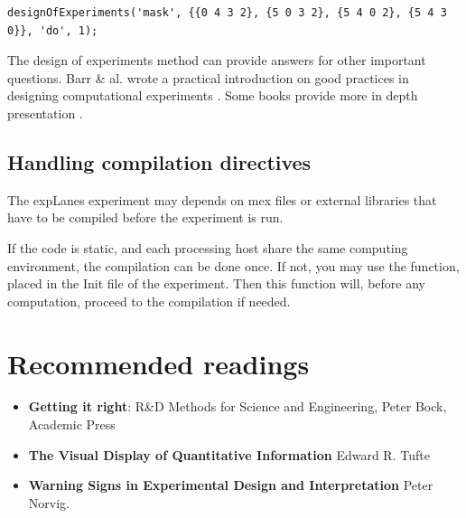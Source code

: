 \documentclass[a4paper,fleqn]{tufte-handout}
\newcommand{\explanes}{\textsf{expLanes} }
\begin{document}
\begin{lstlisting}
designOfExperiments('mask', {{0 4 3 2}, {5 0 3 2}, {5 4 0 2}, {5 4 3 0}}, 'do', 1);
\end{lstlisting}

The design of experiments method can provide answers for other important questions. Barr \& al.  wrote a practical introduction on good practices in designing computational experiments \cite{design}. Some books provide more in depth presentation \cite{de,se}.




\subsection{Handling compilation directives}

The \explanes experiment may depends on mex files or external libraries that have to be compiled before the experiment is run.

If the code is static, and each processing host share the same computing environment, the compilation can be done once. If not, you may use the  function, placed in the Init file of the experiment. Then this function will, before any computation, proceed to the compilation if needed.

%
%
%
%
%
%
%
%
%
%
%
%
%

\section{Recommended readings}

\begin{itemize}

\item \textbf{Getting it right}: R\&D Methods for Science and Engineering, Peter Bock, Academic Press

\item \textbf{The Visual Display of Quantitative Information} Edward R. Tufte

\item \textbf{Warning Signs in Experimental Design and Interpretation} Peter Norvig.

\end{itemize}


\end{document}
